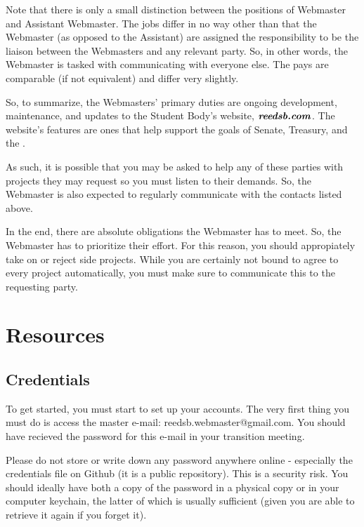 \documentclass[a4paper]{article}
\begin{document}
\begin{note*}[Positions]
  Note that there is only a small distinction between the positions of Webmaster and Assistant Webmaster. The jobs differ in no way other than that the Webmaster (as opposed to the Assistant) are assigned the responsibility to be the liaison between the Webmasters and any relevant party. So, in other words, the Webmaster is tasked with communicating with everyone else. The pays are comparable (if not equivalent) and differ very slightly.
\end{note*}

\noindent So, to summarize, the Webmasters' primary duties are ongoing development, maintenance, and updates to the Student Body’s website, $\textbf{\textit{reedsb.com}}$. The website's features are ones that help support the goals of Senate, Treasury, and the \OSE.

As such, it is possible that you may be asked to help any of these parties with projects they may request so you must listen to their demands. So, the Webmaster is also expected to regularly communicate with the contacts listed above.

\begin{remark*}[Prioritize]
In the end, there are absolute obligations the Webmaster has to meet. So, the Webmaster has to prioritize their effort. For this reason, you should appropiately take on or reject side projects. While you are certainly not bound to agree to every project automatically, you must make sure to communicate this to the requesting party.
\end{remark*}

\newpage
\section{Resources}

\subsection{Credentials}

To get started, you must start to set up your accounts. The very first thing you must do is access the master e-mail: reedsb.webmaster@gmail.com. You should have recieved the password for this e-mail in your transition meeting.

\begin{warning*}
  Please do not store or write down any password anywhere online - especially the credentials file on Github (it is a public repository). This is a security risk. You should ideally have both a copy of the password in a physical copy or in your computer keychain, the latter of which is usually sufficient (given you are able to retrieve it again if you forget it).
\end{warning*}
\end{document}

